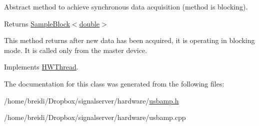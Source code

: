 Abstract method to achieve synchronous data acquisition (method is blocking). \begin{DoxyReturn}{Returns}
\hyperlink{class_sample_block}{SampleBlock$<$double$>$}
\end{DoxyReturn}
This method returns after new data has been acquired, it is operating in blocking mode. It is called only from the master device. 

Implements \hyperlink{class_h_w_thread_add1215b3e0f06a856330f2debd7ea2fe}{HWThread}.

The documentation for this class was generated from the following files:\begin{DoxyCompactItemize}
\item 
/home/breidi/Dropbox/signalserver/hardware/\hyperlink{usbamp_8h}{usbamp.h}\item 
/home/breidi/Dropbox/signalserver/hardware/usbamp.cpp\end{DoxyCompactItemize}
